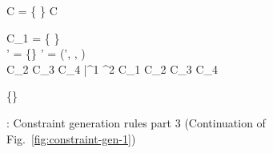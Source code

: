 \begin{figure*}[t!]
  {
     \spc
     \spc
    \spc
    C = \{ \rgn \in \rhoenv \}
  }
  {
     {C}
  }

  {
    C_1 = \{ \rgn \in \rhoenv \}
    \\
    \rhobar \notin \rhoenv \spc
    \rhoenv' = \rhoenv \cup \{\rhobar\} \spc
    \A' = (\rhoenv', \aenv, \phicx \conj \phi)
    \\
     {C_2} \spc 
     {C_3} \spc
     {C_4}
  }
  {
    \typeok{(\rhoenv,\aenv,\phicx)} {\inang{\rhobar \,|\, \phi} \bar{\tau^1} \xrightarrow{\rgn} \tau^2} 
       {C_1 \cup C_2 \cup C_3 \cup C_4}
  }

  { 
  }
  {
    \typeok {(\rhoenv,\aenv,\phicx)} {\RgnZ{}\inang{\toprgn}} {\{\}}
  }

\myendrules

\caption{\fbname: Constraint generation rules part 3 (Continuation of
Fig.~\ref{fig:constraint-gen-1})}
\label{fig:constraint-gen-2}
\end{figure*}
\clearpage

